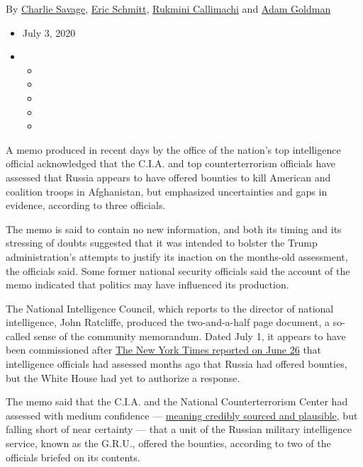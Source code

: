 By \href{https://www.nytimes.com/by/charlie-savage}{Charlie Savage},
\href{https://www.nytimes.com/by/eric-schmitt}{Eric Schmitt},
\href{https://www.nytimes.com/by/rukmini-callimachi}{Rukmini Callimachi}
and \href{https://www.nytimes.com/by/adam-goldman}{Adam Goldman}

\begin{itemize}
\item
  July 3, 2020
\item
  \begin{itemize}
  \item
  \item
  \item
  \item
  \item
  \end{itemize}
\end{itemize}

A memo produced in recent days by the office of the nation's top
intelligence official acknowledged that the C.I.A. and top
counterterrorism officials have assessed that Russia appears to have
offered bounties to kill American and coalition troops in Afghanistan,
but emphasized uncertainties and gaps in evidence, according to three
officials.

The memo is said to contain no new information, and both its timing and
its stressing of doubts suggested that it was intended to bolster the
Trump administration's attempts to justify its inaction on the
months-old assessment, the officials said. Some former national security
officials said the account of the memo indicated that politics may have
influenced its production.

The National Intelligence Council, which reports to the director of
national intelligence, John Ratcliffe, produced the two-and-a-half page
document, a so-called sense of the community memorandum. Dated July 1,
it appears to have been commissioned after
\href{https://www.nytimes.com/2020/06/26/us/politics/russia-afghanistan-bounties.html}{The
New York Times reported on June 26} that intelligence officials had
assessed months ago that Russia had offered bounties, but the White
House had yet to authorize a response.

The memo said that the C.I.A. and the National Counterterrorism Center
had assessed with medium confidence ---
\href{https://www.dni.gov/files/documents/Newsroom/Reports\%20and\%20Pubs/20071203_release.pdf}{meaning
credibly sourced and plausible}, but falling short of near certainty ---
that a unit of the Russian military intelligence service, known as the
G.R.U., offered the bounties, according to two of the officials briefed
on its contents.

